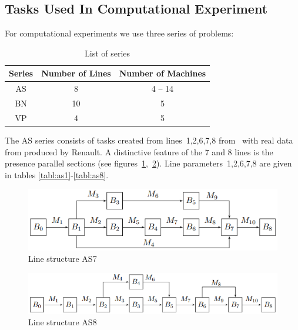\documentclass{ifacconf}
\begin{document}
\subsection{Tasks Used In Computational Experiment}\label{subsec:tasks}
For computational experiments we use three series of problems:
\begin{table}[!ht]
\centering
\small
\begin{tabular}{|c|c|c|}
\hline
Series&Number of Lines&Number of Machines\\
\hline
AS & 8 & 4 -- 14 \\
BN & 10 & 5 \\
VP & 4 & 5 \\
\hline
\end{tabular}
\caption{List of series}\label{tabl:series}
\vspace{-0.5cm}
\end{table}

The AS series consists of tasks created from lines~1,2,6,7,8 from~\cite{Ancelin1987} with real data from
produced by Renault.
A distinctive feature of the 7 and 8 lines is the presence
parallel sections (see figures~\ref{fig:vis_as7},~\ref{fig:vis_as8}).
Line parameters~1,2,6,7,8 are given in tables \ref{tabl:as1}-\ref{tabl:as8}.

 \begin{figure}[h!]
	\centering
	\includegraphics[scale=0.6]{ans7}
  \caption{Line structure AS7} \label{fig:vis_as7}
  \end{figure}

 \begin{figure}[h!]
	\centering
	\includegraphics[scale=0.55]{ans8}
  \caption{Line structure AS8} \label{fig:vis_as8}
  \end{figure}
\end{document}
